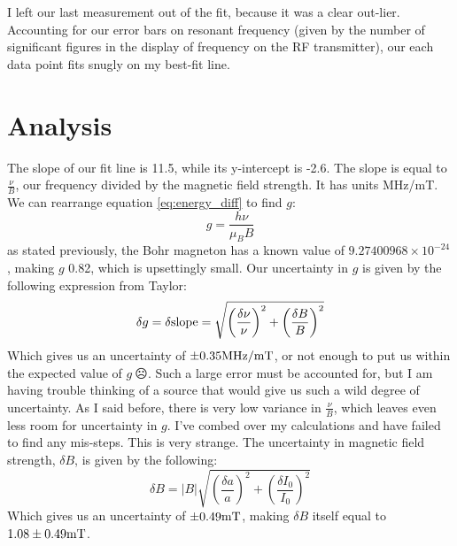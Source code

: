 \documentclass{amsart}
\begin{document}
I left our last measurement out of the fit, because it was a clear out-lier. Accounting for our error bars on resonant frequency (given by the number of significant figures in the display of frequency on the RF transmitter), our each data point fits snugly on my best-fit line.

\section{Analysis}
The slope of our fit line is 11.5, while its y-intercept is -2.6. The slope is equal to $\frac{\nu}{B}$, our frequency divided by the magnetic field strength. It has units MHz/mT. We can rearrange equation \ref{eq:energy_diff} to find $g$:
\begin{equation}
    g = \frac{h\nu}{\mu_B B}
\end{equation}
as stated previously, the Bohr magneton has a known value of $9.27400968\times10^{−24}$, making $g$ 0.82, which is upsettingly small. Our uncertainty in $g$ is given by the following expression from Taylor:
\begin{equation}
    \delta g = \delta{\rm slope} = \sqrt{\left(\frac{\delta\nu}{\nu}\right)^2 + \left(\frac{\delta B}{B}\right)^2}
\end{equation}
Which gives us an uncertainty of $\pm 0.35 {\rm MHz/mT}$, or not enough to put us within the expected value of $g \ \frownie$. Such a large error must be accounted for, but I am having trouble thinking of a source that would give us such a wild degree of uncertainty. As I said before, there is very low variance in $\frac{\nu}{B}$, which leaves even less room for uncertainty in $g$. I've combed over my calculations and have failed to find any mis-steps. This is very strange. The uncertainty in magnetic field strength, $\delta B$, is given by the following:
\begin{equation}
    \delta B = |B|\sqrt{\left(\frac{\delta a}{a}\right)^2 + \left(\frac{\delta I_0}{I_0}\right)^2}
\end{equation}
Which gives us an uncertainty of $\pm 0.49 {\rm mT}$, making $\delta B$ itself equal to $1.08\pm0.49 {\rm mT}$. 
\end{document}
